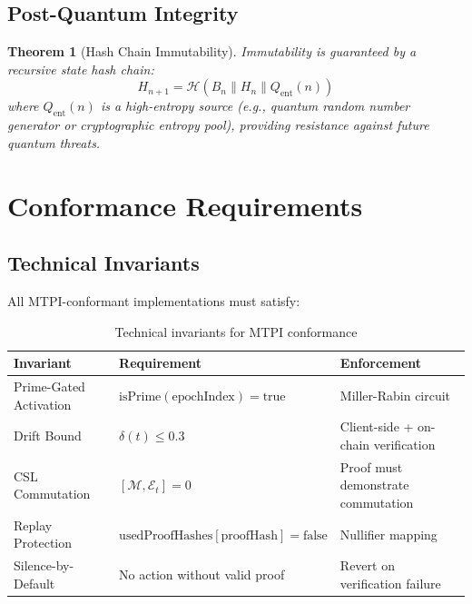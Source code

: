 \documentclass[11pt,a4paper]{article}
\newtheorem{theorem}{Theorem}[section]
\begin{document}
\subsection{Post-Quantum Integrity}

\begin{theorem}[Hash Chain Immutability]
Immutability is guaranteed by a recursive state hash chain:
\begin{equation}
    H_{n+1} = \mathcal{H}(B_n \| H_n \| Q_{\text{ent}}(n))
    \label{eq:hash_chain}
\end{equation}
where $Q_{\text{ent}}(n)$ is a high-entropy source (e.g., quantum random number generator or cryptographic entropy pool), providing resistance against future quantum threats.
\end{theorem}

\section{Conformance Requirements}

\subsection{Technical Invariants}

All MTPI-conformant implementations must satisfy:

\begin{table}[h]
\centering
\begin{tabular}{@{}lll@{}}
\toprule
\textbf{Invariant} & \textbf{Requirement} & \textbf{Enforcement} \\ \midrule
Prime-Gated Activation & $\text{isPrime}(\text{epochIndex}) = \text{true}$ & Miller-Rabin circuit \\
Drift Bound & $\delta(t) \leq 0.3$ & Client-side + on-chain verification \\
CSL Commutation & $[\mathcal{M}, \mathcal{E}_t] = 0$ & Proof must demonstrate commutation \\
Replay Protection & $\text{usedProofHashes}[\text{proofHash}] = \text{false}$ & Nullifier mapping \\
Silence-by-Default & No action without valid proof & Revert on verification failure \\ \bottomrule
\end{tabular}
\caption{Technical invariants for MTPI conformance}
\label{tab:invariants}
\end{table}
\end{document}
